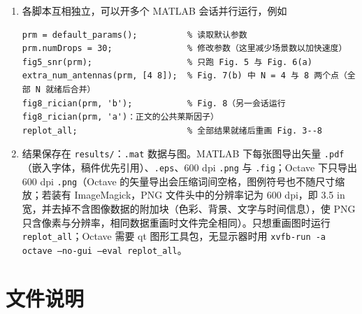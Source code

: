 \documentclass[11pt,a4paper]{ctexart}
\newcommand{\code}[1]{\texttt{#1}}
\begin{document}
\begin{enumerate}
\item 各脚本互相独立，可以开多个 MATLAB 会话并行运行，例如
\begin{lstlisting}
prm = default_params();          % 读取默认参数
prm.numDrops = 30;               % 修改参数（这里减少场景数以加快速度）
fig5_snr(prm);                   % 只跑 Fig. 5 与 Fig. 6(a)
extra_num_antennas(prm, [4 8]);  % Fig. 7(b) 中 N = 4 与 8 两个点（全部 N 就绪后合并）
fig8_rician(prm, 'b');           % Fig. 8（另一会话运行 fig8_rician(prm, 'a')：正文的公共莱斯因子）
replot_all;                      % 全部结果就绪后重画 Fig. 3--8
\end{lstlisting}
\item 结果保存在 \code{results/}：\code{.mat} 数据与图。MATLAB 下每张图导出矢量 \code{.pdf}（嵌入字体，稿件优先引用）、\code{.eps}、600 dpi \code{.png} 与 \code{.fig}；Octave 下只导出 600 dpi \code{.png}（Octave 的矢量导出会压缩词间空格，图例符号也不随尺寸缩放；若装有 ImageMagick，PNG 文件头中的分辨率记为 600 dpi，即 3.5 in 宽，并去掉不含图像数据的附加块（色彩、背景、文字与时间信息），使 PNG 只含像素与分辨率，相同数据重画时文件完全相同）。只想重画图时运行 \code{replot\_all}；Octave 需要 qt 图形工具包，无显示器时用 \code{xvfb-run -a octave --no-gui --eval replot\_all}。
\end{enumerate}

\section{文件说明}
\end{document}
